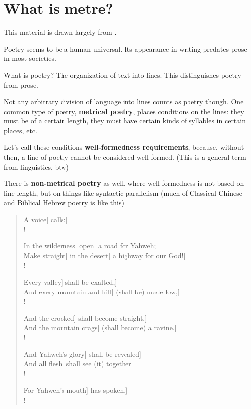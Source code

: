 \chapter{What is metre?}

This material is drawn largely from \textcite{fabb2008meter}.

\ex Poetry seems to be a human universal. Its appearance in writing predates prose in most societies.
\xe

\ex What is poetry? The organization of text into lines. This distinguishes poetry from prose.
\xe

\ex Not any arbitrary division of language into lines counts as poetry though. One common type of poetry, \textbf{metrical poetry}, places conditions on the lines: they must be of a certain length, they must have certain kinds of syllables in certain places, etc.
\xe

\ex Let's call these conditions \textbf{well-formedness requirements}, because, without then, a line of poetry cannot be considered well-formed. (This is a general term from linguistics, btw)
\xe

\ex There is \textbf{non-metrical poetry} as well, where well-formedness is not based on line length, but on things like syntactic parallelism (much of Classical Chinese and Biblical Hebrew poetry is like this):
\xe

\ex \begin{verse}
  A voice] calls:]\\!

  In the wilderness] open] a road for Yahweh;]\\
  Make straight] in the desert] a highway for our God!]\\!

  Every valley] shall be exalted,]\\
  And every mountain and hill] (shall be) made low,]\\!

  And the crooked] shall become straight,]\\
  And the mountain crags] (shall become) a ravine.]\\!

  And Yahweh's glory] shall be revealed]\\
  And all flesh] shall see (it) together]\\!

  For Yahweh's mouth] has spoken.]\\!
\end{verse}
\xe

